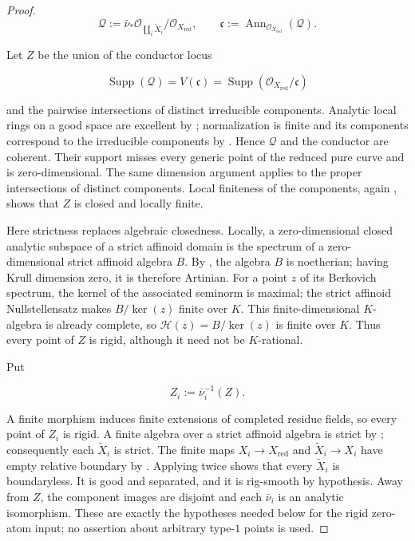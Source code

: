 \begin{proof}
\[
 \mathcal Q:=\bar\nu_*\mathcal O_{\coprod_i\widetilde X_i}
                 /\mathcal O_{X_{\mathrm{red}}},
 \qquad
 \mathfrak c:=\operatorname{Ann}_{\mathcal O_{X_{\mathrm{red}}}}
                         (\mathcal Q).
\]

Let \(Z\) be the union of the conductor locus

\[
 \operatorname{Supp}(\mathcal Q)
   =V(\mathfrak c)
   =\operatorname{Supp}(\mathcal O_{X_{\mathrm{red}}}/\mathfrak c)
\]

and the pairwise intersections of distinct irreducible components.
Analytic local rings on a good space are excellent by
\cite[\S11.1.10]{CLD25}; normalization is finite and its components
correspond to the irreducible components by
\cite[\S11.3.1]{CLD25}.  Hence \(\mathcal Q\) and the conductor are
coherent.  Their support misses every generic point of the reduced pure
curve and is zero-dimensional.  The same dimension argument applies to
the proper intersections of distinct components.  Local finiteness of the
components, again \cite[\S11.2.5]{CLD25}, shows that \(Z\) is closed and
locally finite.

Here strictness replaces algebraic closedness.  Locally, a
zero-dimensional closed analytic subspace of a strict affinoid domain is
the spectrum of a zero-dimensional strict affinoid algebra \(B\).  By
\cite[Theorem~4.5]{Tate71Rigid}, the algebra \(B\) is noetherian; having
Krull dimension zero, it is therefore Artinian.
For a point \(z\) of its Berkovich spectrum, the kernel of the associated
seminorm is maximal; the strict affinoid Nullstellensatz
\cite[Theorem~4.5]{Tate71Rigid} makes
\(B/\ker(z)\) finite over \(K\).  This finite-dimensional \(K\)-algebra is
already complete, so
\(\mathcal H(z)=B/\ker(z)\) is finite over \(K\).  Thus every point of
\(Z\) is rigid, although it need not be \(K\)-rational.

Put

\begin{equation}
\label{eq:p21p3-nr-conductor-preimage}
                         Z_i:=\bar\nu_i^{-1}(Z).
\end{equation}

A finite morphism induces finite extensions of completed residue fields,
so every point of \(Z_i\) is rigid.  A finite algebra over a strict
affinoid algebra is strict by \cite[Theorem~4.4]{Tate71Rigid};
consequently each \(\widetilde X_i\) is strict.  The finite maps
\(X_i\to X_{\mathrm{red}}\) and
\(\widetilde X_i\to X_i\) have empty relative boundary by
\cite[\S11.4.4]{CLD25}.  Applying
\cite[(11.4.1.3)]{CLD25} twice shows that every
\(\widetilde X_i\) is boundaryless.  It is good and separated, and it is
rig-smooth by hypothesis.  Away from \(Z\), the component images are
disjoint and each \(\bar\nu_i\) is an analytic isomorphism.  These are
exactly the hypotheses needed below for the rigid zero-atom input; no
assertion about arbitrary type-\(1\) points is used.


\end{proof}
